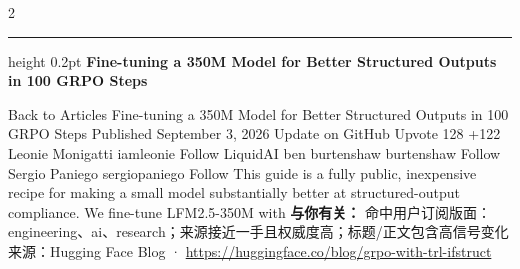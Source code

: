 \documentclass[10.5pt]{ctexart}
\begin{document}
\begin{multicols}{2}
\vspace{2mm}
\hrule height 0.2pt
\vspace{2mm}
{\large\bfseries Fine-tuning a 350M Model for Better Structured Outputs in 100 GRPO Steps}\par
Back to Articles Fine-tuning a 350M Model for Better Structured Outputs in 100 GRPO Steps Published September 3, 2026 Update on GitHub Upvote 128 +122 Leonie Monigatti iamleonie Follow LiquidAI ben burtenshaw burtenshaw Follow Sergio Paniego sergiopaniego Follow This guide is a fully public, inexpensive recipe for making a small model substantially better at structured-output compliance. We fine-tune LFM2.5-350M with
\textbf{与你有关：} 命中用户订阅版面：engineering、ai、research；来源接近一手且权威度高；标题/正文包含高信号变化
{\footnotesize\color{ormuted} 来源：Hugging Face Blog · \url{https://huggingface.co/blog/grpo-with-trl-ifstruct}}
\end{multicols}
\end{document}
